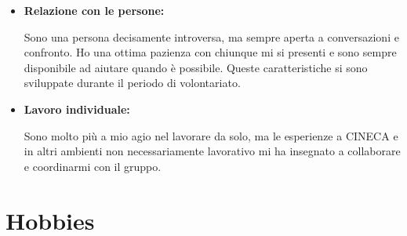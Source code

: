 \documentclass{paper}
\begin{document}
\begin{itemize}
    \item \textbf{Relazione con le persone:}
    
    Sono una persona decisamente introversa,
    ma sempre aperta a conversazioni e confronto.
    Ho una ottima pazienza con chiunque mi si presenti
    e sono sempre disponibile ad aiutare quando è possibile.
    Queste caratteristiche si sono sviluppate durante
    il periodo di volontariato.

    \item \textbf{Lavoro individuale:}
    
    Sono molto più a mio agio nel lavorare da solo,
    ma le esperienze a CINECA e in altri ambienti non
    necessariamente lavorativo mi ha insegnato a
    collaborare e coordinarmi con il gruppo.
\end{itemize}

\section{Hobbies}
\end{document}
